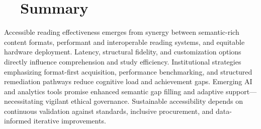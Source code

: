 \section{~~Summary}
\label{sec:sr27-summary}
Accessible reading effectiveness emerges from synergy between semantic-rich content formats, performant and interoperable reading systems, and equitable hardware deployment. Latency, structural fidelity, and customization options directly influence comprehension and study efficiency. Institutional strategies emphasizing format-first acquisition, performance benchmarking, and structured remediation pathways reduce cognitive load and achievement gaps. Emerging AI and analytics tools promise enhanced semantic gap filling and adaptive support—necessitating vigilant ethical governance. Sustainable accessibility depends on continuous validation against standards, inclusive procurement, and data-informed iterative improvements.


